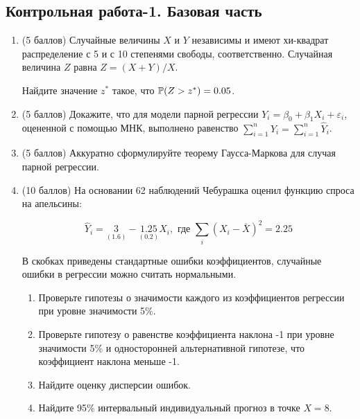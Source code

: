 \subsection{Контрольная работа-1. Базовая часть}













\begin{enumerate}
  \item (5 баллов) Случайные величины $X$ и $Y$ независимы и имеют хи-квадрат распределение
  с 5 и с 10 степенями свободы, соответственно. Случайная величина $Z$ равна $Z = (X+Y)/X$.

  Найдите значение $z^*$ такое, что $\P(Z > z^*)=0.05$.
  \item (5 баллов) Докажите, что для модели парной регрессии $Y_i = \beta_0 + \beta_1 X_i + \varepsilon_i$,
оцененной с помощью МНК, выполнено равенство $\sum_{i=1}^n Y_i = \sum_{i=1}^n \hat Y_i$.

  \item (5 баллов) Аккуратно сформулируйте теорему Гаусса-Маркова для случая парной регрессии.

  \item (10 баллов) На основании 62 наблюдений Чебурашка оценил функцию спроса на апельсины:

 \[
 \hat Y_i = \underset{(1.6)}{3} - \underset{(0.2)}{1.25} X_i, \text{ где } \sum_i (X_i - \bar X)^2 =2.25
 \]

 В скобках приведены стандартные ошибки коэффициентов, случайные ошибки в регрессии можно считать нормальными.


  \begin{enumerate}
    \item Проверьте гипотезы о значимости каждого из коэффициентов регрессии при уровне значимости 5\%.
    \item Проверьте гипотезу о равенстве коэффициента наклона -1 при уровне значимости 5\%
    и односторонней альтернативной гипотезе, что коэффициент наклона меньше -1.
    \item Найдите оценку дисперсии ошибок.
    \item Найдите 95\% интервальный индивидуальный прогноз в точке $X=8$.
  \end{enumerate}
\end{enumerate}

